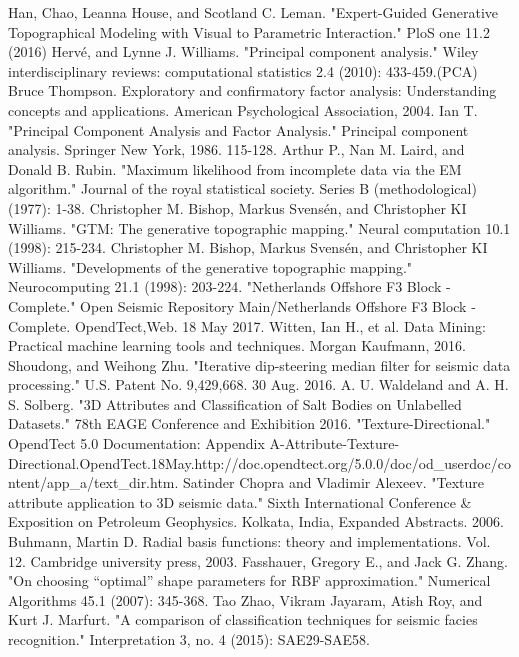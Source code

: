 \documentclass[a4paper]{article}
\begin{document}
\begin{thebibliography}{00}
Han, Chao, Leanna House, and Scotland C. Leman. "Expert-Guided Generative Topographical Modeling with Visual to Parametric Interaction." PloS one 11.2 (2016)
Hervé, and Lynne J. Williams. "Principal component analysis." Wiley interdisciplinary reviews: computational statistics 2.4 (2010): 433-459.(PCA)
Bruce Thompson. Exploratory and confirmatory factor analysis: Understanding concepts and applications. American Psychological Association, 2004.
Ian T. "Principal Component Analysis and Factor Analysis." Principal component analysis. Springer New York, 1986. 115-128.
Arthur P., Nan M. Laird, and Donald B. Rubin. "Maximum likelihood from incomplete data via the EM algorithm." Journal of the royal statistical society. Series B (methodological) (1977): 1-38.
Christopher M. Bishop, Markus Svensén, and Christopher KI Williams. "GTM: The generative topographic mapping." Neural computation 10.1 (1998): 215-234.
Christopher M. Bishop, Markus Svensén, and Christopher KI Williams. "Developments of the generative topographic mapping." Neurocomputing 21.1 (1998): 203-224.
"Netherlands Offshore F3 Block - Complete." Open Seismic Repository Main/Netherlands Offshore F3 Block - Complete. OpendTect,Web. 18 May 2017.
Witten, Ian H., et al. Data Mining: Practical machine learning tools and techniques. Morgan Kaufmann, 2016.
Shoudong, and Weihong Zhu. "Iterative dip-steering median filter for seismic data processing." U.S. Patent No. 9,429,668. 30 Aug. 2016.
A. U. Waldeland and A. H. S. Solberg. "3D Attributes and Classification of Salt Bodies on Unlabelled Datasets." 78th EAGE Conference and Exhibition 2016.
"Texture-Directional." OpendTect 5.0 Documentation: Appendix A-Attribute-Texture-Directional.OpendTect.18May.http://doc.opendtect.org/5.0.0/doc/od\_userdoc/content/app\_a/text\_dir.htm.
Satinder Chopra and Vladimir Alexeev. "Texture attribute application to 3D seismic data." Sixth International Conference \& Exposition on Petroleum Geophysics. Kolkata, India, Expanded Abstracts. 2006.
Buhmann, Martin D. Radial basis functions: theory and implementations. Vol. 12. Cambridge university press, 2003.
Fasshauer, Gregory E., and Jack G. Zhang. "On choosing “optimal” shape parameters for RBF approximation." Numerical Algorithms 45.1 (2007): 345-368.
Tao Zhao, Vikram Jayaram, Atish Roy, and Kurt J. Marfurt. "A comparison of classification techniques for seismic facies recognition." Interpretation 3, no. 4 (2015): SAE29-SAE58.
\end{thebibliography}
\end{document}
